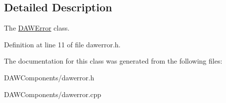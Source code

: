 \subsection{Detailed Description}
The \hyperlink{class_d_a_w_inputs_1_1_d_a_w_error}{D\-A\-W\-Error} class. 

Definition at line 11 of file dawerror.\-h.



The documentation for this class was generated from the following files\-:\begin{DoxyCompactItemize}
\item 
D\-A\-W\-Components/dawerror.\-h\item 
D\-A\-W\-Components/dawerror.\-cpp\end{DoxyCompactItemize}
